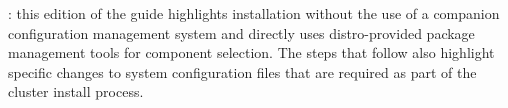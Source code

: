 : this edition of the guide highlights
installation without the use of a companion configuration management system and
directly uses distro-provided package management tools for component
selection. The steps that follow also highlight specific changes to system
configuration files that are required as part of the cluster install
process. 
